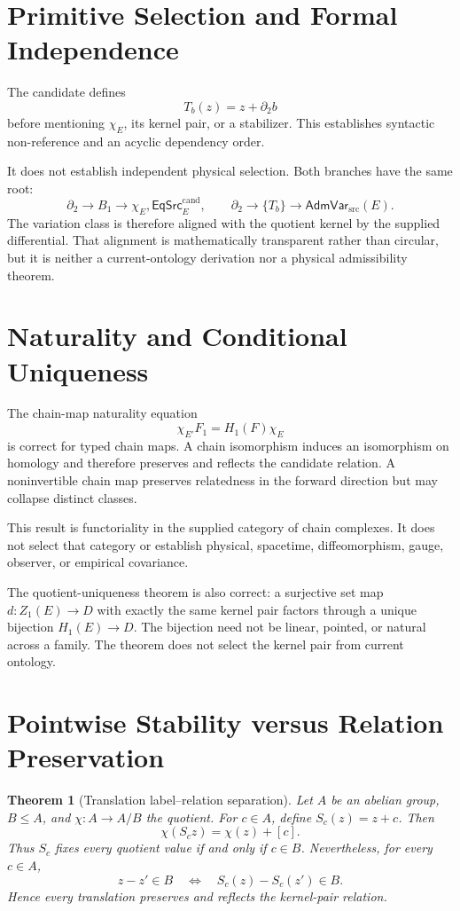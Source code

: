 \documentclass[11pt]{article}
\newtheorem{theorem}{Theorem}
\newcommand{\EqCand}{\mathsf{EqSrc}^{\mathrm{cand}}}
\newcommand{\AdmVar}{\mathsf{AdmVar}_{\mathrm{src}}}
\begin{document}
\section{Primitive Selection and Formal Independence}

The candidate defines
\[
T_b(z)=z+\partial_2b
\]
before mentioning \(\chi_E\), its kernel pair, or a stabilizer. This establishes
syntactic non-reference and an acyclic dependency order.

It does not establish independent physical selection. Both branches have the
same root:
\[
\partial_2\longrightarrow B_1\longrightarrow \chi_E,\EqCand_E,
\qquad
\partial_2\longrightarrow\{T_b\}\longrightarrow\AdmVar(E).
\]
The variation class is therefore aligned with the quotient kernel by the
supplied differential. That alignment is mathematically transparent rather
than circular, but it is neither a current-ontology derivation nor a physical
admissibility theorem.

\section{Naturality and Conditional Uniqueness}

The chain-map naturality equation
\[
\chi_{E'}F_1=H_1(F)\chi_E
\]
is correct for typed chain maps. A chain isomorphism induces an isomorphism on
homology and therefore preserves and reflects the candidate relation. A
noninvertible chain map preserves relatedness in the forward direction but may
collapse distinct classes.

This result is functoriality in the supplied category of chain complexes. It
does not select that category or establish physical, spacetime,
diffeomorphism, gauge, observer, or empirical covariance.

The quotient-uniqueness theorem is also correct: a surjective set map
\(d:Z_1(E)\to D\) with exactly the same kernel pair factors through a unique
bijection \(H_1(E)\to D\). The bijection need not be linear, pointed, or
natural across a family. The theorem does not select the kernel pair from
current ontology.

\section{Pointwise Stability versus Relation Preservation}

\begin{theorem}[Translation label--relation separation]
Let \(A\) be an abelian group, \(B\leq A\), and
\(\chi:A\to A/B\) the quotient. For \(c\in A\), define
\(S_c(z)=z+c\). Then
\[
\chi(S_cz)=\chi(z)+[c].
\]
Thus \(S_c\) fixes every quotient value if and only if \(c\in B\). Nevertheless,
for every \(c\in A\),
\[
z-z'\in B
\quad\Longleftrightarrow\quad
S_c(z)-S_c(z')\in B.
\]
Hence every translation preserves and reflects the kernel-pair relation.
\end{theorem}
\end{document}
